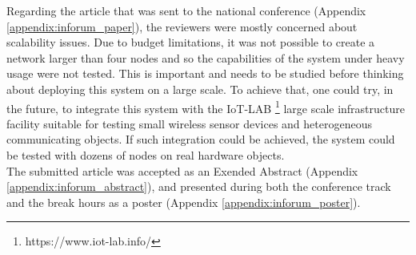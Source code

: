 Regarding the article that was sent to the national conference (Appendix \ref{appendix:inforum_paper}), the reviewers were mostly concerned about scalability issues. Due to budget limitations, it was not possible to create a network larger than four nodes and so the capabilities of the system under heavy usage were not tested. This is important and needs to be studied before thinking about deploying this system on a large scale. To achieve that, one could try, in the future, to integrate this system with the IoT-LAB \footnote{https://www.iot-lab.info/} large scale infrastructure facility suitable for testing small wireless sensor devices and heterogeneous communicating objects. If such integration could be achieved, the system could be tested with dozens of nodes on real hardware objects.\\
The submitted article was accepted as an Exended Abstract (Appendix \ref{appendix:inforum_abstract}), and presented during both the conference track and the break hours as a poster (Appendix \ref{appendix:inforum_poster}).